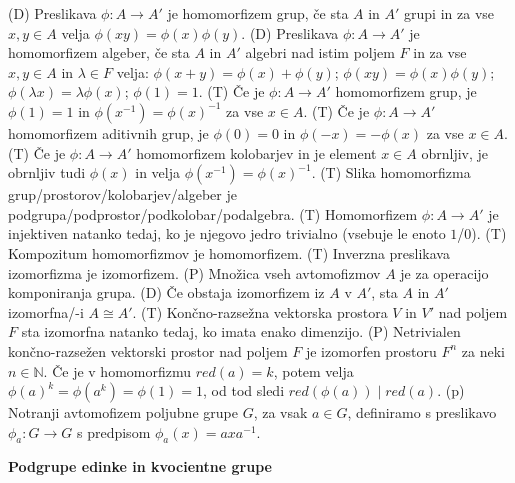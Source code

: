 \documentclass[10pt]{extarticle}
\begin{document}
        
             (D) Preslikava $\phi: A\to A'$ je homomorfizem grup, če sta $A$ in $A'$ grupi in za vse $x,y\in A$ velja $\phi(xy)=\phi(x)\phi(y)$.
             (D) Preslikava $\phi: A\to A'$ je homomorfizem algeber, če sta $A$ in $A'$ algebri nad istim poljem $F$ in za vse $x,y\in A$ in $\lambda \in F$ velja: $\phi(x+y)=\phi(x)+\phi(y)$; $\phi(xy)=\phi(x)\phi(y)$; $\phi(\lambda x)=\lambda\phi(x)$; $\phi(1)=1$.
             (T) Če je $\phi: A\to A'$ homomorfizem grup, je $\phi(1)=1$ in $\phi(x^{-1})=\phi(x)^{-1}$ za vse $x\in A$.
             (T) Če je $\phi: A\to A'$ homomorfizem aditivnih grup, je $\phi(0)=0$ in $\phi(-x)=-\phi(x)$ za vse $x\in A$.
             (T) Če je $\phi: A\to A'$ homomorfizem kolobarjev in je element $x\in A$ obrnljiv, je obrnljiv tudi $\phi(x)$ in velja $\phi(x^{-1})=\phi(x)^{-1}$.
             (T) Slika homomorfizma grup/prostorov/kolobarjev/algeber je podgrupa/podprostor/podkolobar/podalgebra.
             (T) Homomorfizem $\phi: A\to A'$ je injektiven natanko tedaj, ko je njegovo jedro trivialno (vsebuje le enoto $1$/$0$).
             (T) Kompozitum homomorfizmov je homomorfizem.
             (T) Inverzna preslikava izomorfizma je izomorfizem.
             (P) Množica vseh avtomofizmov $A$ je za operacijo komponiranja grupa.
             (D) Če obstaja izomorfizem iz $A$ v $A'$, sta $A$ in $A'$ izomorfna/-i $A\cong A'$.
             (T) Končno-razsežna vektorska prostora $V$ in $V'$ nad poljem $F$ sta izomorfna natanko tedaj, ko imata enako dimenzijo.
             (P) Netrivialen končno-razsežen vektorski prostor nad poljem $F$ je izomorfen prostoru $F^n$ za neki $n\in\mathbb{N}$.
             Če je v homomorfizmu $red(a)=k$, potem velja $\phi(a)^k=\phi(a^k)=\phi(1)=1$, od tod sledi $red(\phi(a))\mid red(a)$.
             (p) Notranji avtomofizem poljubne grupe $G$, za vsak $a\in G$, definiramo s preslikavo $\phi_a:G\to G$ s predpisom $\phi_a(x)=axa^{-1}$.
     

    \textbf{Podgrupe edinke in kvocientne grupe}
\end{document}
